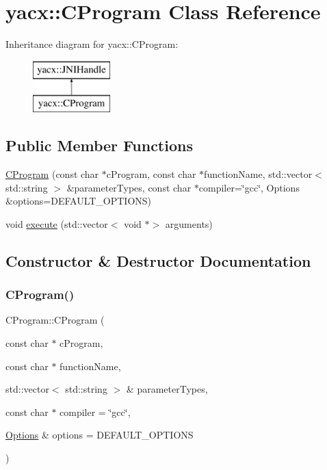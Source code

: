 \hypertarget{classyacx_1_1_c_program}{}\section{yacx\+:\+:C\+Program Class Reference}
\label{classyacx_1_1_c_program}
Inheritance diagram for yacx\+:\+:C\+Program\+:\begin{figure}[H]
\begin{center}
\leavevmode
\includegraphics[height=2.000000cm]{classyacx_1_1_c_program}
\end{center}
\end{figure}
\subsection*{Public Member Functions}
\begin{DoxyCompactItemize}
\item 
\hyperlink{classyacx_1_1_c_program_aa5c8ed40dc90db7652fd0b0924297a45}{C\+Program} (const char $\ast$c\+Program, const char $\ast$function\+Name, std\+::vector$<$ std\+::string $>$ \&parameter\+Types, const char $\ast$compiler=\char`\"{}gcc\char`\"{}, Options \&options=D\+E\+F\+A\+U\+L\+T\+\_\+\+O\+P\+T\+I\+O\+NS)
\item 
void \hyperlink{classyacx_1_1_c_program_a353a1d5aa467ef283a4b5b35ac8d634e}{execute} (std\+::vector$<$ void $\ast$$>$ arguments)
\end{DoxyCompactItemize}


\subsection{Constructor \& Destructor Documentation}
\mbox{\label{classyacx_1_1_c_program_aa5c8ed40dc90db7652fd0b0924297a45}} 
\subsubsection{\texorpdfstring{C\+Program()}{CProgram()}}
{\footnotesize\ttfamily C\+Program\+::\+C\+Program (\begin{DoxyParamCaption}\item[{const char $\ast$}]{c\+Program,  }\item[{const char $\ast$}]{function\+Name,  }\item[{std\+::vector$<$ std\+::string $>$ \&}]{parameter\+Types,  }\item[{const char $\ast$}]{compiler = {\ttfamily \char`\"{}gcc\char`\"{}},  }\item[{\hyperlink{classyacx_1_1_options}{Options} \&}]{options = {\ttfamily DEFAULT\+\_\+OPTIONS} }\end{DoxyParamCaption})}

